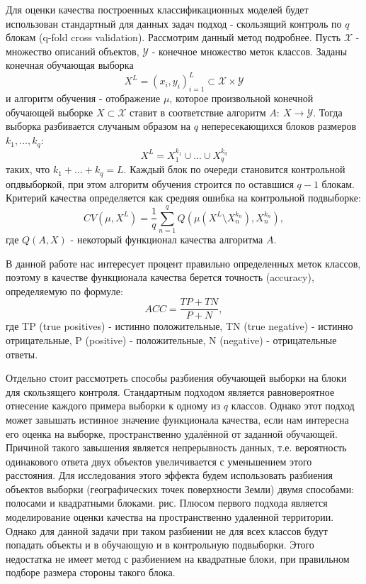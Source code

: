 \documentclass[12pt]{article}
\begin{document}
\par
Для оценки качества построенных классификационных моделей будет использован стандартный
для данных задач подход - скользящий контроль по $q$ блокам (q-fold cross validation).
Рассмотрим данный метод подробнее. 
Пусть $\mathcal{X}$ - множество описаний объектов, 
$\mathcal{Y}$ - конечное множество меток классов. Заданы конечная обучающая выборка
\[
    X^L=(x_i, y_i)_{i=1}^L \subset \mathcal{X} \times \mathcal{Y} 
\]
и алгоритм обучения - отображение $\mu$, которое
произвольной конечной обучающей выборке $X \subset \mathcal{X}$
ставит в соответствие алгоритм $A:\ X \to \mathcal{Y}$.
Тогда выборка разбивается случаным образом на $q$ непересекающихся блоков размеров
$k_1,...,k_q$:
\[
    X^L=X_1^{k_1} \cup ... \cup X_q^{k_q}
\]
таких, что $k_1+...+k_q=L$. Каждый блок по очереди становится контрольной опдвыборкой,
при этом алгоритм обучения строится по оставшися $q-1$ блокам. Критерий качества
определяется как средняя ошибка на контрольной подвыборке:
\[
    CV(\mu, X^L)=\frac{1}{q}\sum_{n=1}^q Q(\mu(X^L \setminus X_n^{k_n}),X_n^{k_n}),
\]
где $Q(A, X)$ - некоторый функционал качества алгоритма $A$.
\par
В данной работе нас интересует процент правильно определенных меток классов,
поэтому в качестве функционала качества берется точность (accuracy),
определяемую по формуле:
\[
    ACC=\frac{TP+TN}{P+N},
\]
где TP (true positives) - истинно положительные, TN (true negative) - истинно отрицательные,
P (positive) - положительные, N (negative) - отрицательные ответы.
\par
Отдельно стоит рассмотреть способы разбиения обучающей выборки на блоки для скользящего
контроля. Стандартным подходом является равновероятное отнесение каждого примера выборки
к одному из $q$ классов. Однако этот подход может завышать истинное значение функционала
качества, если нам интересна его оценка на выборке, пространственно удалённой от заданной
обучающей. Причиной такого завышения является непрерывность данных, т.е. вероятность 
одинакового ответа двух объектов увеличивается с уменьшением этого расстояния.
Для исследования этого эффекта будем использовать разбиения объектов выборки
(географических точек поверхности Земли) двумя способами: полосами и квадратными блоками.
{\color{red} рис}. Плюсом первого подхода является моделирование оценки качества на
пространственно удаленной территории. Однако для данной задачи при таком разбиении
не для всех классов будут попадать объекты и в обучающую и в контрольную подвыборки.
Этого недостатка не имеет метод с разбиением на квадратные блоки, при правильном
подборе размера стороны такого блока.
\par
\end{document}
